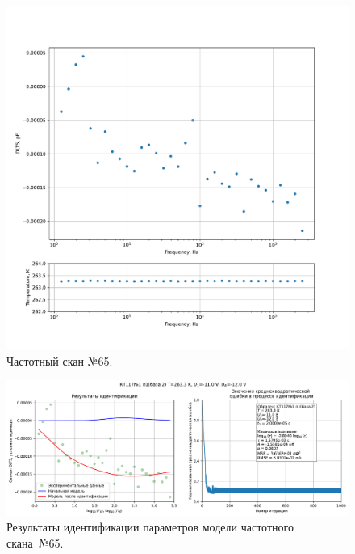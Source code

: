 \begin{figure}[!ht]
    \centering
    \includegraphics[width=1\textwidth]{../plots/КТ117№1_п1(база 2)_2500Гц-1Гц_1пФ_-10С_-11В-12В_10мВ_20мкс_шаг_0,1.pdf}
    \caption{Частотный скан №65.}
    \label{pic:frequency_scan_65}
\end{figure}

\begin{figure}[!ht]
    \centering
    \includegraphics[width=1\textwidth]{../plots/КТ117№1_п1(база 2)_2500Гц-1Гц_1пФ_-10С_-11В-12В_10мВ_20мкс_шаг_0,1_model.pdf}
    \caption{Результаты идентификации параметров модели частотного скана~№65.}
    \label{pic:frequency_scan_model65}
\end{figure}

\pagebreak


